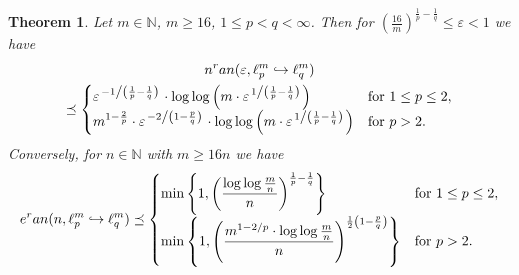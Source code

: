 \documentclass[12pt]{article}
\theoremstyle{plain}
\newtheorem{theorem}{Theorem}[section]
\theoremstyle{definition}
\newcommand{\ran}{\textup{ran}}
\newcommand{\eps}{\varepsilon}
\newcommand{\embed}{\hookrightarrow}
\newcommand{\N}{{\mathbb N}}
\begin{document}
\begin{theorem} \label{thm:complexity}
    Let $m \in \N$, $m \geq 16$, 
    $1 \leq p < q < \infty$.
    Then for 
    $\left(\frac{16}{m}\right)^{\frac{1}{p} - \frac{1}{q}} \leq \eps < 1$
    we have
    \begin{multline*}
        n^\ran(\eps,\ell_p^m \embed \ell_q^m) \\
            \preceq \begin{cases}
                \eps^{\left. - 1 \middle/ \left(\frac{1}{p} - \frac{1}{q}\right) \right.}
                \cdot \log \log \left(m \cdot \eps^{\left. 1 \middle/ \left(\frac{1}{p} - \frac{1}{q}\right) \right.}\right)
                    &\text{for } 1 \leq p \leq 2, \\
                m^{1 - \frac{2}{p}} \cdot \eps^{\left. -2 \middle/ \left(1 - \frac{p}{q}\right) \right.}
                \cdot \log \log \left(m \cdot \eps^{\left. 1 \middle/ \left(\frac{1}{p} - \frac{1}{q}\right) \right.}\right)
                    &\text{for } p > 2.
            \end{cases}
    \end{multline*}
    Conversely, for $n \in \N$ with $m \geq 16n$ we have
    \begin{equation*}
        e^\ran(n,\ell_p^m \embed \ell_q^m)
            \preceq
                \begin{cases}
                    \displaystyle
                    \min\left\{1, 
                    \left(\frac{\log \log \frac{m}{n}}{n}\right)^{\frac{1}{p} - \frac{1}{q}}
                        \right\}
                        &\text{for } 1 \leq p \leq 2,\\
                    \displaystyle 
                    \min\left\{1, 
                        \left(\frac{m^{1-2/p} \cdot \log \log \frac{m}{n}}{n}\right)^{\frac{1}{2}\left(1 - \frac{p}{q}\right)}
                        \right\}
                        &\text{for } p > 2.
                \end{cases}
    \end{equation*}
\end{theorem}
\end{document}

